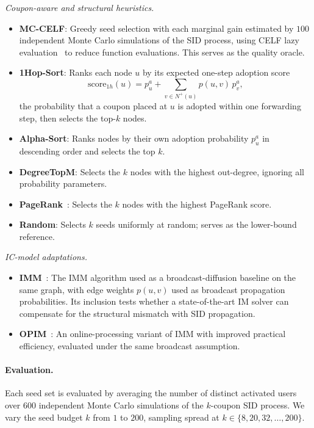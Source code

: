 \documentclass[sigconf]{acmart}
\begin{document}
\smallskip\noindent\textit{Coupon-aware and structural heuristics.}
\begin{itemize}
  \item \textbf{MC-CELF}: Greedy seed selection with each marginal gain estimated by $100$ independent Monte Carlo simulations of the SID process, using CELF lazy evaluation~\cite{leskovec2007celf} to reduce function evaluations. This serves as the quality oracle.
  \item \textbf{1Hop-Sort}: Ranks each node $u$ by its expected one-step adoption score
    \[
      \mathrm{score}_{1h}(u) = p_u^a + \sum_{v \in N^+(u)} p(u,v)\, p_v^a,
    \]
    the probability that a coupon placed at $u$ is adopted within one forwarding step, then selects the top-$k$ nodes.
  \item \textbf{Alpha-Sort}: Ranks nodes by their own adoption probability $p_u^a$ in descending order and selects the top $k$.
  \item \textbf{DegreeTopM}: Selects the $k$ nodes with the highest out-degree, ignoring all probability parameters.
  \item \textbf{PageRank}~\cite{page1999pagerank}: Selects the $k$ nodes with the highest PageRank score.
  \item \textbf{Random}: Selects $k$ seeds uniformly at random; serves as the lower-bound reference.
\end{itemize}

\smallskip\noindent\textit{IC-model adaptations.}
\begin{itemize}
  \item \textbf{IMM}~\cite{tang2015influence}: The IMM algorithm used as a broadcast-diffusion baseline on the same graph, with edge weights $p(u,v)$ used as broadcast propagation probabilities. Its inclusion tests whether a state-of-the-art IM solver can compensate for the structural mismatch with SID propagation.
  \item \textbf{OPIM}~\cite{tang2018online}: An online-processing variant of IMM with improved practical efficiency, evaluated under the same broadcast assumption.
\end{itemize}

\paragraph{Evaluation.}
Each seed set is evaluated by averaging the number of distinct activated users over $600$ independent Monte Carlo simulations of the $k$-coupon SID process. We vary the seed budget $k$ from $1$ to $200$, sampling spread at $k \in \{8, 20, 32, \ldots, 200\}$.
\end{document}
